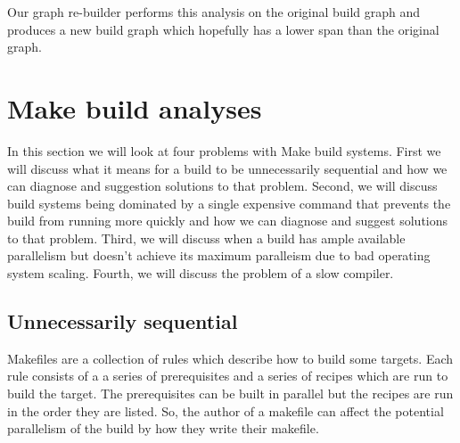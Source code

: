 \documentclass[twocolumn,acmtog,10pt,review]{acmart}
\begin{document}
Our graph re-builder performs this analysis on the original build graph and produces a new build
graph which hopefully has a lower span than the original graph.





\section{Make build analyses}

In this section we will look at four problems with Make build systems.  First we will discuss
what it means for a build to be unnecessarily sequential and how we can diagnose and suggestion
solutions to that problem.  Second, we will discuss build systems being dominated by a single
expensive command that prevents the build from running more quickly and how we can diagnose and
suggest solutions to that problem.  Third, we will discuss when a build has ample available
parallelism but doesn't achieve its maximum paralleism due to bad operating system scaling.
Fourth, we will discuss the problem of a slow compiler.

\subsection{Unnecessarily sequential}

Makefiles are a collection of rules which describe how to build some targets.  Each rule consists
of a a series of prerequisites and a series of recipes which are run to build the target.  The
prerequisites can be built in parallel but the recipes are run in the order they are listed.  So,
the author of a makefile can affect the potential parallelism of the build by how they write their
makefile.
\end{document}
